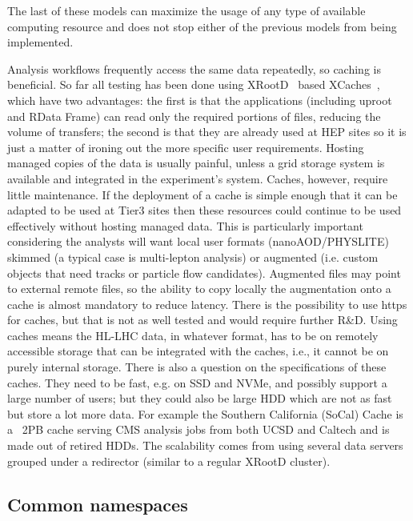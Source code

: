 The last of these models can maximize the usage of any type of available computing resource and does not stop either of the previous models from being implemented.

Analysis workflows frequently access the same data repeatedly, so caching is beneficial. So far all testing has been done using XRootD~\cite{xrootd} based XCaches~\cite{xcache}, which have two advantages: the first is that the applications (including uproot~\cite{uproot} and RData Frame\cite{rdataframe}) can read only the required portions of files, reducing the volume of transfers; the second is that they are already used at HEP sites so it is just a matter of ironing out the more specific user requirements. Hosting managed copies of the data is usually painful, unless a grid storage system is available and integrated in the experiment’s system. Caches, however, require little maintenance. If the deployment of a cache is simple enough that it can be adapted to be used at Tier3 sites then these resources could continue to be used effectively without hosting managed data. This is particularly important considering the analysts will want local user formats (nanoAOD/PHYSLITE) skimmed (a typical case is  multi-lepton analysis) or augmented (i.e. custom objects that need tracks or particle flow candidates). Augmented files may point to external remote files, so the ability to copy locally the augmentation onto a cache is almost mandatory to reduce latency. There is the possibility to use https for caches, but that is not as well tested and would require further R\&D. Using caches means the HL-LHC data, in whatever format, has to be on remotely accessible storage that can be integrated with the caches, i.e., it cannot be on purely internal storage. There is also a question on the specifications of these caches. They need to be fast, e.g. on SSD and NVMe, and possibly support a large number of users; but they could also be large HDD which are not as fast but store a lot more data. For example the Southern California (SoCal) Cache is a ~2PB cache serving CMS analysis jobs from both UCSD and Caltech and is made out of retired HDDs. The scalability comes from using several data servers grouped under a redirector (similar to a regular XRootD cluster). 

\subsection*{Common namespaces} 

